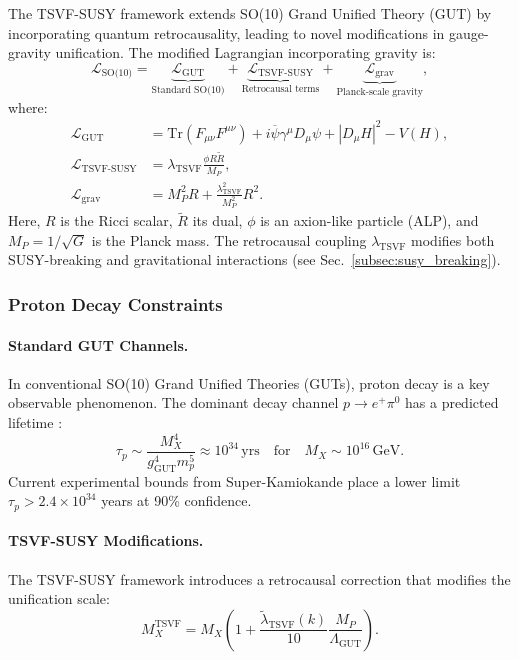 \documentclass[twocolumn,superscriptaddress,floatfix]{revtex4-2}
\begin{document}
The TSVF-SUSY framework extends SO(10) Grand Unified Theory (GUT) by incorporating quantum retrocausality, leading to novel modifications in gauge-gravity unification. The modified Lagrangian incorporating gravity is:
\begin{equation}
\mathcal{L}_{\text{SO(10)}} = \underbrace{\mathcal{L}_{\text{GUT}}}_{\text{Standard SO(10)}} + \underbrace{\mathcal{L}_{\text{TSVF-SUSY}}}_{\text{Retrocausal terms}} + \underbrace{\mathcal{L}_{\text{grav}}}_{\text{Planck-scale gravity}},
\end{equation}
where:
\begin{align}
\mathcal{L}_{\text{GUT}} &= \text{Tr}(F_{\mu\nu}F^{\mu\nu}) + i\overline{\psi}\gamma^\mu D_\mu\psi + |D_\mu H|^2 - V(H), \label{eq:L_GUT} \\
\mathcal{L}_{\text{TSVF-SUSY}} &= \lambda_{\text{TSVF}}\frac{\phi R\tilde{R}}{M_P}, \label{eq:L_TSVF} \\
\mathcal{L}_{\text{grav}} &= M_P^2 R + \frac{\lambda_{\text{TSVF}}^2}{M_P^2}R^2. \label{eq:L_grav}
\end{align}
Here, $R$ is the Ricci scalar, $\tilde{R}$ its dual, $\phi$ is an axion-like particle (ALP), and $M_P = 1/\sqrt{G}$ is the Planck mass. The retrocausal coupling $\lambda_{\text{TSVF}}$ modifies both SUSY-breaking and gravitational interactions (see Sec.~\ref{subsec:susy_breaking}).


\subsubsection{Proton Decay Constraints}
\label{subsec:proton_decay}

\paragraph{Standard GUT Channels.} 
In conventional SO(10) Grand Unified Theories (GUTs), proton decay is a key observable phenomenon. The dominant decay channel $p \to e^+ \pi^0$ has a predicted lifetime \cite{SuperK}:
\begin{equation}
\tau_p \sim \frac{M_X^4}{g_{\text{GUT}}^4 m_p^5} \approx 10^{34}\,\text{yrs}\quad \text{for}\quad M_X \sim 10^{16}\,\text{GeV}.
\label{eq:tau_std}
\end{equation}
Current experimental bounds from Super-Kamiokande place a lower limit $\tau_p > 2.4 \times 10^{34}$ years at 90\% confidence.

\paragraph{TSVF-SUSY Modifications.} 
The TSVF-SUSY framework introduces a retrocausal correction that modifies the unification scale:
\begin{equation}
M_X^{\text{TSVF}} = M_X\left(1 + \frac{\tilde{\lambda}_{\text{TSVF}}(k)}{10}\frac{M_P}{\Lambda_{\text{GUT}}}\right).
\label{eq:Mx_shift_corrected}
\end{equation}
\end{document}
